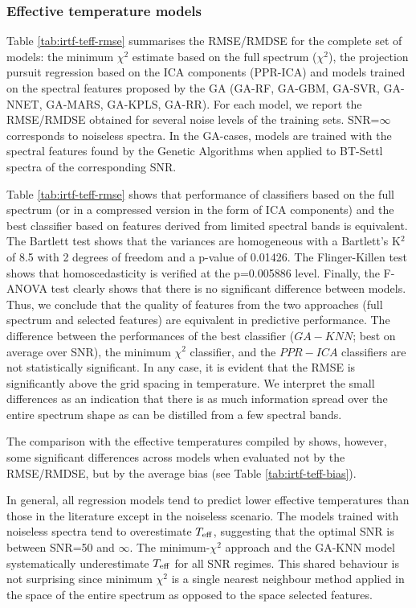 
\subsubsection{Effective temperature models}
\label{sect:irtf-teff}

Table \ref{tab:irtf-teff-rmse} summarises the RMSE/RMDSE for the
complete set of models: the minimum $\chi^2$ estimate based on the
full spectrum ($\chi^2$), the projection pursuit regression based on
the ICA components (PPR-ICA) and models trained on the spectral
features proposed by the GA (GA-RF, GA-GBM, GA-SVR, GA-NNET, GA-MARS,
GA-KPLS, GA-RR). For each model, we report the RMSE/RMDSE obtained for
several noise levels of the training sets.  SNR=$\infty$ corresponds
to noiseless spectra. In the GA-cases, models are trained with the
spectral features found by the Genetic Algorithms when applied to
BT-Settl spectra of the corresponding SNR.

Table \ref{tab:irtf-teff-rmse} shows that performance of classifiers
based on the full spectrum (or in a compressed version in the form of
ICA components) and the best classifier based on features derived from
limited spectral bands is equivalent. The Bartlett test shows that the
variances are homogeneous with a Bartlett\textquoteright s K$^2$ of
8.5 with 2 degrees of freedom and a p-value of 0.01426. The
Flinger-Killen test shows that homoscedasticity is verified at the
p=0.005886 level. Finally, the F-ANOVA test clearly shows that there
is no significant difference between models. Thus, we conclude that
the quality of features from the two approaches (full spectrum and
selected features) are equivalent in predictive performance.  The
difference between the performances of the best classifier ($GA-KNN$;
best on average over SNR), the minimum $\chi^2$ classifier, and the
$PPR-ICA$ classifiers are not statistically significant.  In any case,
it is evident that the RMSE is significantly above the grid spacing in
temperature. We interpret the small differences as an indication that
there is as much information spread over the entire spectrum shape as
can be distilled from a few spectral bands.

The comparison with the effective temperatures compiled by
\cite{cesetti} shows, however, some significant differences across
models when evaluated not by the RMSE/RMDSE, but by the average bias
(see Table \ref{tab:irtf-teff-bias}). 

In general, all regression models tend to predict lower effective
temperatures than those in the literature except in the noiseless
scenario. The models trained with noiseless spectra tend to
overestimate $T_{\rm eff}$, suggesting that the optimal SNR is between
SNR=50 and $\infty$. The minimum-$\chi^2$ approach and the GA-KNN
model systematically underestimate $T_{\rm eff}$ for all SNR
regimes. This shared behaviour is not surprising since minimum
$\chi^2$ is a single nearest neighbour method applied in the space of
the entire spectrum as opposed to the space selected features.

